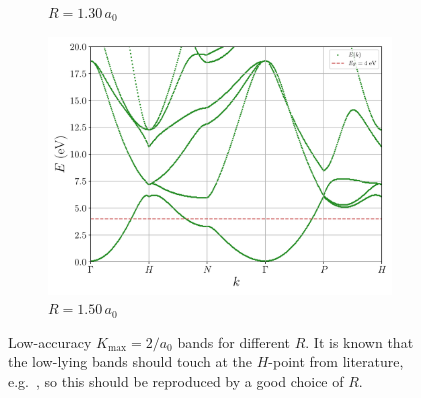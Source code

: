 \documentclass[a4paper,DIV=12,english]{scrartcl}
\begin{document}
\begin{figure}
\begin{subfigure}{0.49\textwidth}
        \caption{$R=1.30\,a_0$}
        \label{subfig:bs_2_130}
    \end{subfigure}
    \begin{subfigure}{0.49\textwidth}
        \centering 
        \includegraphics[width=\textwidth]{../plots/bs_2_R_150.pdf}
        \caption{$R=1.50\,a_0$}
        \label{subfig:bs_2_150}
    \end{subfigure}
    \caption{Low-accuracy $K_\text{max} = 2/a_0$ bands for different $R$. It is known that the low-lying bands should touch at the $H$-point from literature, e.g.~\cite{perdew_li}, so this should be reproduced by a good choice of $R$.}
    \label{fig:bs_var_R}
\end{figure}
\end{document}
